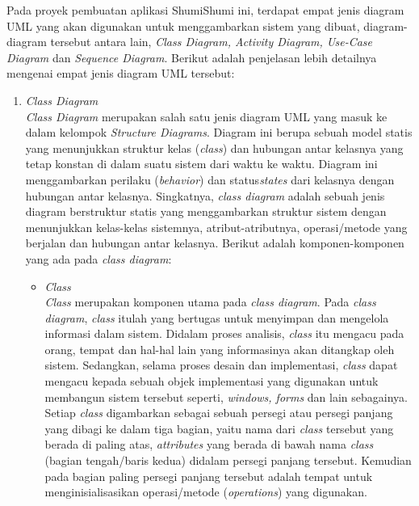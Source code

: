 \documentclass[a4paper]{article}
\begin{document}
Pada proyek pembuatan aplikasi ShumiShumi ini, terdapat empat jenis diagram UML yang akan digunakan untuk menggambarkan sistem yang dibuat, diagram-diagram tersebut antara lain, \textit{Class Diagram, Activity Diagram, Use-Case Diagram} dan \textit{Sequence Diagram}. Berikut adalah penjelasan lebih detailnya mengenai empat jenis diagram UML tersebut:
\begin{enumerate}
    \item \textit{Class Diagram}\\
    \textit{Class Diagram} merupakan salah satu jenis diagram UML yang masuk ke dalam kelompok \textit{Structure Diagrams}. Diagram ini berupa sebuah model statis yang menunjukkan struktur kelas (\textit{class}) dan hubungan antar kelasnya yang tetap konstan di dalam suatu sistem dari waktu ke waktu. Diagram ini menggambarkan perilaku (\textit{behavior}) dan status\textit{states} dari kelasnya dengan hubungan antar kelasnya\autocite{systemanalysisdesign-class-diagram}. Singkatnya, \textit{class diagram} adalah sebuah jenis diagram berstruktur statis yang menggambarkan struktur sistem dengan menunjukkan kelas-kelas sistemnya, atribut-atributnya, operasi/metode yang berjalan dan hubungan antar kelasnya\autocite{what-is-class-diagram}. Berikut adalah komponen-komponen yang ada pada \textit{class diagram}:
    \begin{itemize}
        \item \textit{Class}\\
        \textit{Class} merupakan komponen utama pada \textit{class diagram}. Pada \textit{class diagram}, \textit{class} itulah yang bertugas untuk menyimpan dan mengelola informasi dalam sistem. Didalam proses analisis, \textit{class} itu mengacu pada orang, tempat dan hal-hal lain yang informasinya akan ditangkap oleh sistem. Sedangkan, selama proses desain dan implementasi, \textit{class} dapat mengacu kepada sebuah objek implementasi yang digunakan untuk membangun sistem tersebut seperti, \textit{windows, forms} dan lain sebagainya. Setiap \textit{class} digambarkan sebagai sebuah persegi atau persegi panjang yang dibagi ke dalam tiga bagian, yaitu nama dari \textit{class} tersebut yang berada di paling atas, \textit{attributes} yang berada di bawah nama \textit{class} (bagian tengah/baris kedua) didalam persegi panjang tersebut. Kemudian pada bagian paling persegi panjang tersebut adalah tempat untuk menginisialisasikan operasi/metode (\textit{operations}) yang digunakan\autocite{systemanalysisdesign-class-diagram}.
        \begin{figure}[h]

\end{figure}
\end{itemize}
\end{enumerate}
\end{document}

